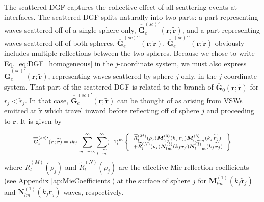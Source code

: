 The scattered DGF captures the collective effect of all scattering events at interfaces. The scattered DGF splits naturally into two parts: a part representing waves scattered off of a single sphere only, $\overline{\overline{\boldsymbol{G}}}_{e}^{(sc)\prime}(\boldsymbol{r}; \boldsymbol{\widetilde{r}})$, and a part representing waves scattered off of both spheres, $\overline{\overline{\boldsymbol{G}}}_{e}^{(sc)\prime\prime}(\boldsymbol{r}; \boldsymbol{\widetilde{r}})$. $\overline{\overline{\boldsymbol{G}}}_{e}^{(sc)\prime\prime}(\boldsymbol{r}; \boldsymbol{\widetilde{r}})$  obviously includes multiple reflections between the two spheres. Because we chose to write Eq. \ref{eq:DGF_homogeneous} in the $j$-coordinate system, we must also express $\overline{\overline{\boldsymbol{G}}}_{e}^{(sc)\prime}(\boldsymbol{r}; \boldsymbol{\widetilde{r}})$, representing waves scattered by sphere $j$ only, in the $j$-coordinate system. That part of the scattered DGF is related to the branch of $\overline{\overline{\boldsymbol{G}}}_{0}(\boldsymbol{r}; \boldsymbol{\widetilde{r}})$ for $r_{j} < \widetilde{r}_{j}$. In that case, $\overline{\overline{\boldsymbol{G}}}_{e}^{(sc)\prime}(\boldsymbol{r}; \boldsymbol{\widetilde{r}})$ can be thought of as arising from VSWs emitted at $\boldsymbol{\widetilde{r}}$ which travel inward before reflecting off of sphere $j$ and proceeding to $\boldsymbol{r}$. It is given by
%

\begin{equation}\label{eq:DGF_scattered1} \scriptsize
\overline{\overline{\boldsymbol{G}}}_{e}^{(sc)\prime}(\boldsymbol{r}; \boldsymbol{\widetilde{r}}) = i k_{f} \sum\limits_{m=-\infty}^{\infty} \sum\limits_{l=\widetilde{m}}^{\infty} (-1)^{m}
\left\{\begin{array}{l} \widetilde{R}_{l}^{(M)}(\rho_{j}) \boldsymbol{M}_{l m}^{(3)}(k_{f} \boldsymbol{r}_{j}) \boldsymbol{M}_{l, -m}^{(3)}(k_{f} \widetilde{\boldsymbol{r}}_{j}) \\+ \widetilde{R}_{l}^{(N)}(\rho_{j}) \boldsymbol{N}_{l m}^{(3)}(k_{f} \boldsymbol{r}_{j}) \boldsymbol{N}_{l, -m}^{(3)}(k_{f} \widetilde{\boldsymbol{r}}_{j}) \end{array} \right\}
\end{equation}
%
where $\widetilde{R}_{l}^{(M)}(\rho_{j})$ and $\widetilde{R}_{l}^{(N)}(\rho_{j})$ are the effective Mie reflection coefficients (see Appendix \ref{ap:MieCoefficients}) at the surface of sphere $j$ for $\boldsymbol{M}_{l m}^{(1)}(k_{f} \widetilde{\boldsymbol{r}}_{j})$ and $\boldsymbol{N}_{l m}^{(1)}(k_{f} \widetilde{\boldsymbol{r}}_{j})$ waves, respectively.

